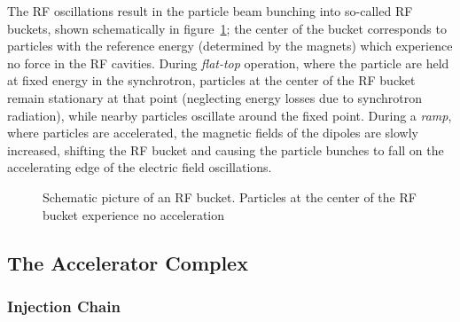 The RF oscillations result in the particle beam bunching into so-called RF buckets, shown schematically in figure~\ref{fig:RF-bucket}; the center of the bucket corresponds to particles with the reference energy (determined by the magnets) which experience no force in the RF cavities. During \emph{flat-top} operation, where the particle are held at fixed energy in the synchrotron, particles at the center of the RF bucket remain stationary at that point (neglecting energy losses due to synchrotron radiation), while nearby particles oscillate around the fixed point. During a \emph{ramp}, where particles are accelerated, the magnetic fields of the dipoles are slowly increased, shifting the RF bucket and causing the particle bunches to fall on the accelerating edge of the electric field oscillations. 

\begin{figure}[htbp]
	\centering
	\caption{Schematic picture of an RF bucket. Particles at the center of the RF bucket experience no acceleration}
	\label{fig:RF-bucket}
\end{figure}

\clearpage

\subsection{The Accelerator Complex}

\subsubsection{Injection Chain}

